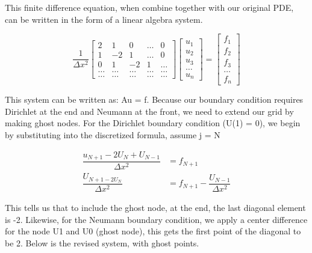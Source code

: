 \documentclass{article}
\begin{document}
\noindent
This finite difference equation, when combine together with our original PDE, can be written in the form of a linear algebra system. 

\[
\dfrac{1}{\Delta x^2}\begin{bmatrix}
2 & 1 & 0 & \dots & 0 \\
1 & -2 & 1 & \dots & 0 \\
0 & 1 & -2 & 1 & \dots \\
\dots  & \dots  & \dots  & \dots & \dots  \\
\dots & \dots & \dots & \dots & \dots 
\end{bmatrix}
\begin{bmatrix}
u_1 \\ u_2 \\ u_3 \\ \dots \\ u_n 
\end{bmatrix}
=
\begin{bmatrix}
f_1 \\ f_2 \\ f_3 \\ \dots \\ f_n 
\end{bmatrix}
\]

\noindent
This system can be written as: Au = f. Because our boundary condition requires Dirichlet at the end and Neumann at the front, we need to extend our grid by making ghost nodes.  For the Dirichlet boundary condition (U(1) = 0), we begin by substituting into the discretized formula, assume j = N

\begin{align*}
\dfrac{u_{N+1}-2U_N+U_{N-1}}{\Delta x^2} &= f_{N+1}\\
\dfrac{U_{N+1-2U_N}}{\Delta x^2} &= f_{N+1} - \dfrac{U_{N-1}}{\Delta x^2}
\end{align*}


This tells us that to include the ghost node, at the end, the last diagonal element is -2. Likewise, for the Neumann boundary condition, we apply a center difference for the node U1 and U0 (ghost node), this gets the first point of the diagonal to be 2.  Below is the revised system, with ghost points. 
\end{document}
